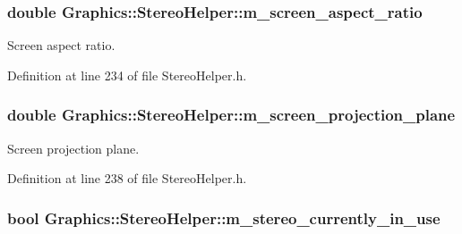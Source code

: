 \hypertarget{class_graphics_1_1_stereo_helper_add543d27ae84db5cbcb664c7c7c08e3b}{
\subsubsection[{m\_\-screen\_\-aspect\_\-ratio}]{\setlength{\rightskip}{0pt plus 5cm}double {\bf Graphics::StereoHelper::m\_\-screen\_\-aspect\_\-ratio}}}
\label{class_graphics_1_1_stereo_helper_add543d27ae84db5cbcb664c7c7c08e3b}


Screen aspect ratio. 



Definition at line 234 of file StereoHelper.h.

\hypertarget{class_graphics_1_1_stereo_helper_a0049a88c84fd0b377b69f6cb7cd4ab86}{
\subsubsection[{m\_\-screen\_\-projection\_\-plane}]{\setlength{\rightskip}{0pt plus 5cm}double {\bf Graphics::StereoHelper::m\_\-screen\_\-projection\_\-plane}}}
\label{class_graphics_1_1_stereo_helper_a0049a88c84fd0b377b69f6cb7cd4ab86}


Screen projection plane. 



Definition at line 238 of file StereoHelper.h.

\hypertarget{class_graphics_1_1_stereo_helper_a01fb4aa644375cbdeb6fe98aa2c42452}{
\subsubsection[{m\_\-stereo\_\-currently\_\-in\_\-use}]{\setlength{\rightskip}{0pt plus 5cm}bool {\bf Graphics::StereoHelper::m\_\-stereo\_\-currently\_\-in\_\-use}}}
\label{class_graphics_1_1_stereo_helper_a01fb4aa644375cbdeb6fe98aa2c42452}


